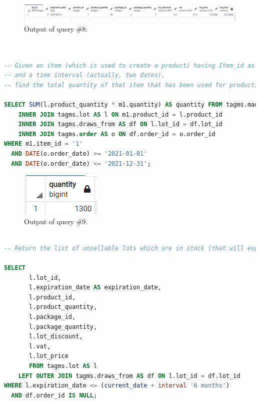 \begin{figure}[h!]
	\centering
	\includegraphics[width=\linewidth]{images/q8}
	\caption{Output of query \#8.}
	\label{fig:q8}
\end{figure}

\begin{lstlisting}[language=SQL,
	keywordstyle=\color{blue},
	stringstyle=\color{mauve},
	showstringspaces=false,
	breaklines=true,
	basicstyle=\ttfamily\footnotesize]


-- Given an item (which is used to create a product) having Item_id as identifier
-- and a time interval (actually, two dates),
-- find the total quantity of that item that has been used for production or packaging during that time.

SELECT SUM(l.product_quantity * m1.quantity) AS quantity FROM tagms.made_up_of_1 AS m1
    INNER JOIN tagms.lot AS l ON m1.product_id = l.product_id
    INNER JOIN tagms.draws_from AS df ON l.lot_id = df.lot_id
    INNER JOIN tagms.order AS o ON df.order_id = o.order_id
WHERE m1.item_id = '1'
  AND DATE(o.order_date) >= '2021-01-01'
  AND DATE(o.order_date) <= '2021-12-31';

\end{lstlisting}

\begin{figure}[h!]
	\centering
	\includegraphics{images/q9}
	\caption{Output of query \#9.}
	\label{fig:q9}
\end{figure}

\begin{lstlisting}[language=SQL,
	keywordstyle=\color{blue},
	stringstyle=\color{mauve},
	showstringspaces=false,
	breaklines=true,
	basicstyle=\ttfamily\footnotesize]

-- Return the list of unsellable lots which are in stock (that will expire in less than 6 months)

SELECT
       l.lot_id,
       l.expiration_date AS expiration_date,
       l.product_id,
       l.product_quantity,
       l.package_id,
       l.package_quantity,
       l.lot_discount,
       l.vat,
       l.lot_price
       FROM tagms.lot AS l
    LEFT OUTER JOIN tagms.draws_from AS df ON l.lot_id = df.lot_id
WHERE l.expiration_date <= (current_date + interval '6 months')
  AND df.order_id IS NULL;

\end{lstlisting}

